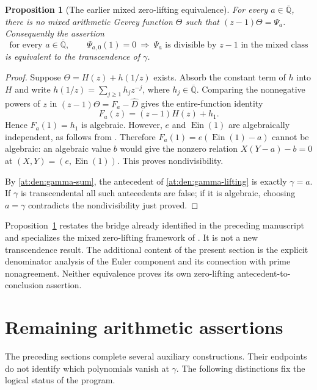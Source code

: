 \documentclass[11pt,a4paper]{article}
\newcommand{\Qbar}{\overline{\mathbb Q}}
\newcommand{\Ein}{\operatorname{Ein}}
\newtheorem{proposition}[theorem]{Proposition}
\theoremstyle{definition}
\theoremstyle{remark}
\numberwithin{equation}{section}
\begin{document}
\begin{proposition}[The earlier mixed zero-lifting equivalence]
\label{at:den:gamma-equivalence}
For every $a\in\Qbar$, there is no mixed arithmetic Gevrey function
$\Theta$ such that $(z-1)\Theta=\Psi_a$.  Consequently the assertion
\begin{equation}\label{at:den:gamma-lifting}
 \text{for every }a\in\Qbar,\qquad
 \Psi_{a,0}(1)=0\ \Longrightarrow\
 \Psi_a\text{ is divisible by }z-1\text{ in the mixed class}
\end{equation}
is equivalent to the transcendence of $\gamma$.
\end{proposition}

\begin{proof}
Suppose $\Theta=H(z)+h(1/z)$ exists.  Absorb the constant term of
$h$ into $H$ and write $h(1/z)=\sum_{j\geq1}h_jz^{-j}$, where
$h_j\in\Qbar$.  Comparing the nonnegative powers of $z$ in
$(z-1)\Theta=F_a-\widehat D$ gives the entire-function identity
\[
 F_a(z)=(z-1)H(z)+h_1.
\]
Hence $F_a(1)=h_1$ is algebraic.  However, $e$ and $\Ein(1)$ are
algebraically independent, as follows from
\cite[Section~5(ii)]{at:Rivoal2012}.  Therefore
$F_a(1)=e(\Ein(1)-a)$ cannot be algebraic: an algebraic value $b$
would give the nonzero relation $X(Y-a)-b=0$ at
$(X,Y)=(e,\Ein(1))$.  This proves nondivisibility.

By \eqref{at:den:gamma-sum}, the antecedent of
\eqref{at:den:gamma-lifting} is exactly $\gamma=a$.  If $\gamma$ is
transcendental all such antecedents are false; if it is algebraic,
choosing $a=\gamma$ contradicts the nondivisibility just proved.
\end{proof}

Proposition~\ref{at:den:gamma-equivalence} restates the bridge already
identified in the preceding manuscript and specializes the mixed
zero-lifting framework of \cite{pm:FischlerRivoal2024}.  It is not a new
transcendence result.  The additional content of the present section
is the explicit denominator analysis of the Euler component and its
connection with prime nonagreement.  Neither equivalence proves its
own zero-lifting antecedent-to-conclusion assertion.

\section{Remaining arithmetic assertions}
\label{at:sec:remaining}

The preceding sections complete several auxiliary constructions. Their
endpoints do not identify which polynomials vanish at $\gamma$.
The following distinctions fix the logical status of the program.
\end{document}
